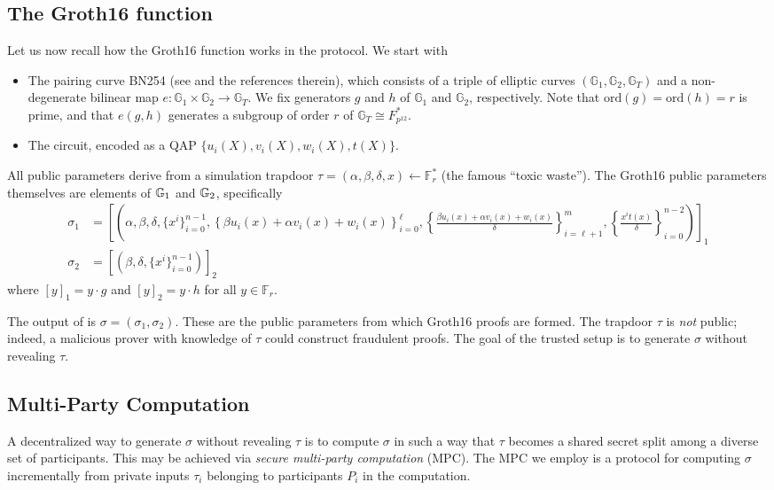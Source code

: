 \subsection{The Groth16 \Setup{} function}
Let us now recall how the Groth16 \Setup{} function works in the \MantaPay{} protocol. We start with 
\begin{itemize}
\item The pairing curve BN254 (see \cite{Naehrig10} and the references therein), which consists of a triple of elliptic curves $(\mathbb{G}_1, \mathbb{G}_2,\mathbb{G}_T) $ and a non-degenerate bilinear map $e: \mathbb{G}_1 \times \mathbb{G}_2 \to \mathbb{G}_T$. We fix generators $g$ and $h$ of $\mathbb{G}_1$ and $\mathbb{G}_2$, respectively. Note that $\textrm{ord}(g) = \textrm{ord}(h) = r$ is prime, and that $e(g,h)$ generates a subgroup of order $r$ of $\mathbb{G}_T \cong F_{p^{12}}^*$.
\item The \MantaPay{} circuit, encoded as a QAP $\{u_i(X), v_i(X), w_i(X), t(X)\}$.
\end{itemize}
All public parameters derive from a simulation trapdoor $\tau = (\alpha, \beta, \delta, x) \leftarrow \mathbb{F}_r^*$ (the famous ``toxic waste''). The Groth16 public parameters themselves are elements of $\mathbb{G}_1$ and $\mathbb{G}_2$, specifically
\begin{align}\label{eq: prover_key} %
\sigma_1 &= \left[ \left(\alpha, \beta, \delta, \{ x^i \}_{i=0}^{n-1},\left\{  \beta u_i(x) + \alpha v_i(x) + w_i(x) \right\}_{i=0}^\ell, \left\{  \frac{\beta u_i(x) + \alpha v_i(x) + w_i(x)}{\delta} \right\}_{i=\ell+1}^m, \left\{ \frac{x^i t(x)}{\delta} \right\}_{i=0}^{n-2} \right) \right]_1 \\
\sigma_2 &= \left[ \left( \beta, \delta,  \{ x^i \}_{i=0}^{n-1} \right) \right]_2
\end{align} 
where $[y]_1 = y \cdot g$ and $[y]_2 = y \cdot h$ for all $y \in \mathbb{F}_r$. 

The output of \Setup{} is $\sigma = (\sigma_1, \sigma_2)$. These are the public parameters from which Groth16 proofs are formed. The trapdoor $\tau$ is \emph{not} public; indeed, a malicious prover with knowledge of $\tau$ could construct fraudulent proofs. The goal of the trusted setup is to generate $\sigma$ without revealing $\tau$.

\subsection{Multi-Party Computation}
A decentralized way to generate $\sigma$ without revealing $\tau$ is to compute $\sigma$ in such a way that $\tau$ becomes a shared secret split among a diverse set of participants. This may be achieved via \emph{secure multi-party computation} (MPC). The MPC we employ is a protocol for computing $\sigma$ incrementally from private inputs $\tau_i$ belonging to participants $P_i$ in the computation. 


